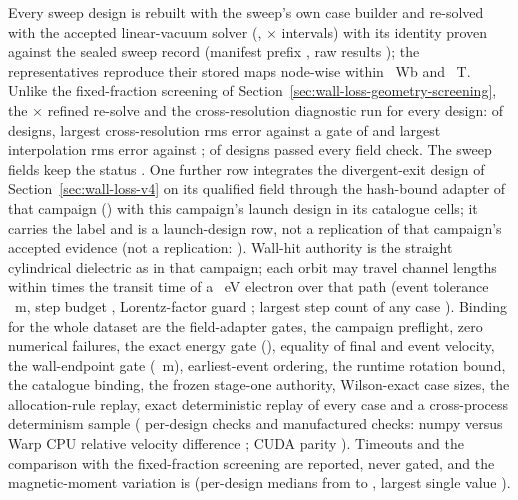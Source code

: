 Every sweep design is rebuilt with the sweep's own case builder and re-solved with the
accepted linear-vacuum \WlhFieldModelLevel{} solver (\texttt{\WlhResolveSolver},
\WlhGridRadial$\times$\WlhGridAxial{} intervals) with its identity proven against the
sealed sweep record (manifest prefix \texttt{\WlhSweepManifestSha}, raw results
\texttt{\WlhSweepRawSha}); the \WlhStoredMapDesigns{} representatives reproduce their
stored maps node-wise within \WlhStoredPsiMaxDiff~Wb and \WlhStoredBMaxDiff~T. Unlike
the fixed-fraction screening of Section~\ref{sec:wall-loss-geometry-screening}, the
\WlhRefinement$\times$ refined re-solve and the cross-resolution diagnostic run for every
design: \WlhCrossResolutionDesigns{} of \WlhDesignCount{} designs, largest cross-resolution
rms error \WlhCrossResolutionRmsMax{} against a gate of \WlhCrossResolutionGate{} and
largest interpolation rms error \WlhInterpolationRmsMax{} against \WlhInterpolationGate;
\WlhIdentityProvenDesigns{} of \WlhDesignCount{} designs passed every field check. The
sweep fields keep the status \texttt{\WlhFieldStatus}. One further row integrates the
divergent-exit design of Section~\ref{sec:wall-loss-v4} on its qualified field through the
hash-bound adapter of that campaign (\WlhPTwoFieldLevel) with this campaign's launch
design in its \WlhPTwoCellCount{} catalogue cells; it carries the label
\texttt{\WlhPTwoLabel} and is a launch-design row, not a replication of that campaign's
accepted evidence (not a replication: \WlhPTwoNotReplication). Wall-hit authority is the
straight cylindrical dielectric as in that campaign; each orbit may travel
\WlhMaxPathLengths{} channel lengths within \WlhMaxTimeFactor{} times the transit time of
a \WlhSlowestEnergy~eV electron over that path (event tolerance \WlhEventTolerance~m,
step budget \WlhMaxSteps, Lorentz-factor guard \WlhMaxGamma; largest step count of any
case \WlhStepsMax). Binding for the whole dataset are the field-adapter gates, the
campaign preflight, zero numerical failures, the exact energy gate (\WlhEnergyGate),
equality of final and event velocity, the wall-endpoint gate (\WlhWallEndpointGate~m),
earliest-event ordering, the runtime rotation bound, the catalogue binding, the frozen
stage-one authority, Wilson-exact case sizes, the allocation-rule replay, exact
deterministic replay of every case and a cross-process determinism sample
(\WlhPerDesignChecks{} per-design checks and \WlhManufacturedChecks{} manufactured
checks: numpy versus Warp CPU relative velocity difference \WlhCpuParityDiff; CUDA
parity \texttt{\WlhCudaParityStatus}). Timeouts and the comparison with the
fixed-fraction screening are reported, never gated, and the magnetic-moment variation
is \texttt{\WlhMuRole} (per-design medians from \WlhMuMedianMin{} to \WlhMuMedianMax,
largest single value \WlhMuMaxMax).

